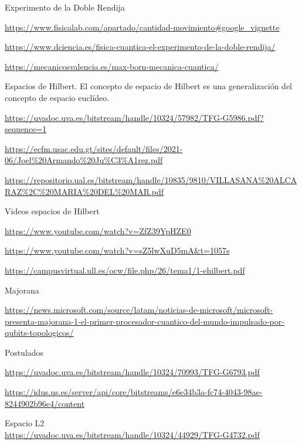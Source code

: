 \documentclass{article}
\numberwithin{equation}{section} %
\begin{document}
        Experimento de la Doble Rendija\par
        \url{https://www.fisicalab.com/apartado/cantidad-movimiento#google_vignette}
        \vspace{2mm}

        \url{https://www.dciencia.es/fisica-cuantica-el-experimento-de-la-doble-rendija/}
        \vspace{2mm}

        \url{https://mecanicosvalencia.es/max-born-mecanica-cuantica/}
        \vspace{2mm}

        Espacios de Hilbert. El concepto de espacio de Hilbert es una generalización del concepto de espacio euclídeo.\par
        \url{https://uvadoc.uva.es/bitstream/handle/10324/57982/TFG-G5986.pdf?sequence=1}
        \vspace{2mm}

        \url{https://ecfm.usac.edu.gt/sites/default/files/2021-06/Joel%20Armando%20Ju%C3%A1rez.pdf}
        \vspace{2mm}

        \url{https://repositorio.ual.es/bitstream/handle/10835/9810/VILLASANA%20ALCARAZ%2C%20MARIA%20DEL%20MAR.pdf}
        \vspace{2mm}

        Videos espacios de Hilbert\par
        \url{https://www.youtube.com/watch?v=ZfZ39YpHZE0}
        \vspace{2mm}

        \url{https://www.youtube.com/watch?v=sZ5lwXuD5mA&t=1057s}
        \vspace{2mm}

        \url{https://campusvirtual.ull.es/ocw/file.php/26/tema1/1-ehilbert.pdf}
        \vspace{2mm}

        Majorana\par
        \url{https://news.microsoft.com/source/latam/noticias-de-microsoft/microsoft-presenta-majorana-1-el-primer-procesador-cuantico-del-mundo-impulsado-por-qubits-topologicos/}
        \vspace{2mm}

        Postulados\par
        \url{https://uvadoc.uva.es/bitstream/handle/10324/70993/TFG-G6793.pdf}
        \vspace{2mm}

        \url{https://idus.us.es/server/api/core/bitstreams/e6e34b3a-fc74-4043-98ae-8244902b96e4/content}
        \vspace{2mm}

        Espacio L2 \\
        \url{https://uvadoc.uva.es/bitstream/handle/10324/44929/TFG-G4732.pdf}

    
\end{document}
